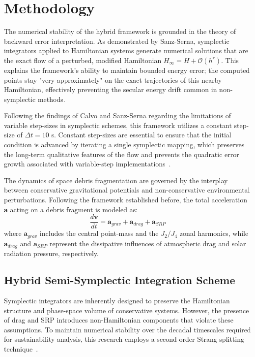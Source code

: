 \documentclass[letterpaper,11pt]{AAS}
\begin{document}
\section{Methodology}

The numerical stability of the hybrid framework is grounded in the theory of backward error interpretation. As demonstrated by Sanz-Serna, symplectic integrators applied to Hamiltonian systems generate numerical solutions that are the exact flow of a perturbed, modified Hamiltonian $H_{\infty} = H + \mathcal{O}(h^r)$. This explains the framework's ability to maintain bounded energy error; the computed points stay "very approximately" on the exact trajectories of this nearby Hamiltonian, effectively preventing the secular energy drift common in non-symplectic methods.

Following the findings of Calvo and Sanz-Serna regarding the limitations of variable step-sizes in symplectic schemes, this framework utilizes a constant step-size of $\Delta t = 10$ s. Constant step-sizes are essential to ensure that the initial condition is advanced by iterating a single symplectic mapping, which preserves the long-term qualitative features of the flow and prevents the quadratic error growth associated with variable-step implementations~\cite{sanz-serna_symplectic_1992}.

The dynamics of space debris fragmentation are governed by the interplay between conservative gravitational potentials and non-conservative environmental perturbations. Following the framework established before, the total acceleration $\mathbf{a}$ acting on a debris fragment is modeled as:
\begin{equation}
    \frac{d\mathbf{v}}{dt} = \mathbf{a}_{grav} + \mathbf{a}_{drag} + \mathbf{a}_{SRP}
\end{equation}
where $\mathbf{a}_{grav}$ includes the central point-mass and the $J_2/J_4$ zonal harmonics, while $\mathbf{a}_{drag}$ and $\mathbf{a}_{SRP}$ represent the dissipative influences of atmospheric drag and solar radiation pressure, respectively.

\subsection{Hybrid Semi-Symplectic Integration Scheme}
Symplectic integrators are inherently designed to preserve the Hamiltonian structure and phase-space volume of conservative systems. However, the presence of drag and SRP introduces non-Hamiltonian components that violate these assumptions. To maintain numerical stability over the decadal timescales required for sustainability analysis, this research employs a second-order Strang splitting technique~\cite{puerta-ibarra_advanced_2025}.
\end{document}
